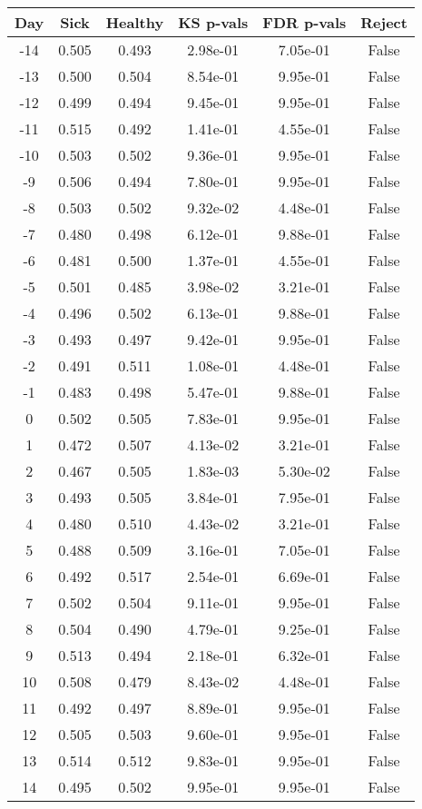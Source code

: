 \begin{tabular}{c|c|c|c|c|c}
Day &  Sick & Healthy &  KS p-vals & FDR p-vals & Reject\\
\hline
-14 & 0.505 &   0.493 &   2.98e-01 &   7.05e-01 &  False\\
-13 & 0.500 &   0.504 &   8.54e-01 &   9.95e-01 &  False\\
-12 & 0.499 &   0.494 &   9.45e-01 &   9.95e-01 &  False\\
-11 & 0.515 &   0.492 &   1.41e-01 &   4.55e-01 &  False\\
-10 & 0.503 &   0.502 &   9.36e-01 &   9.95e-01 &  False\\
 -9 & 0.506 &   0.494 &   7.80e-01 &   9.95e-01 &  False\\
 -8 & 0.503 &   0.502 &   9.32e-02 &   4.48e-01 &  False\\
 -7 & 0.480 &   0.498 &   6.12e-01 &   9.88e-01 &  False\\
 -6 & 0.481 &   0.500 &   1.37e-01 &   4.55e-01 &  False\\
 -5 & 0.501 &   0.485 &   3.98e-02 &   3.21e-01 &  False\\
 -4 & 0.496 &   0.502 &   6.13e-01 &   9.88e-01 &  False\\
 -3 & 0.493 &   0.497 &   9.42e-01 &   9.95e-01 &  False\\
 -2 & 0.491 &   0.511 &   1.08e-01 &   4.48e-01 &  False\\
 -1 & 0.483 &   0.498 &   5.47e-01 &   9.88e-01 &  False\\
  0 & 0.502 &   0.505 &   7.83e-01 &   9.95e-01 &  False\\
  1 & 0.472 &   0.507 &   4.13e-02 &   3.21e-01 &  False\\
  2 & 0.467 &   0.505 &   1.83e-03 &   5.30e-02 &  False\\
  3 & 0.493 &   0.505 &   3.84e-01 &   7.95e-01 &  False\\
  4 & 0.480 &   0.510 &   4.43e-02 &   3.21e-01 &  False\\
  5 & 0.488 &   0.509 &   3.16e-01 &   7.05e-01 &  False\\
  6 & 0.492 &   0.517 &   2.54e-01 &   6.69e-01 &  False\\
  7 & 0.502 &   0.504 &   9.11e-01 &   9.95e-01 &  False\\
  8 & 0.504 &   0.490 &   4.79e-01 &   9.25e-01 &  False\\
  9 & 0.513 &   0.494 &   2.18e-01 &   6.32e-01 &  False\\
 10 & 0.508 &   0.479 &   8.43e-02 &   4.48e-01 &  False\\
 11 & 0.492 &   0.497 &   8.89e-01 &   9.95e-01 &  False\\
 12 & 0.505 &   0.503 &   9.60e-01 &   9.95e-01 &  False\\
 13 & 0.514 &   0.512 &   9.83e-01 &   9.95e-01 &  False\\
 14 & 0.495 &   0.502 &   9.95e-01 &   9.95e-01 &  False\\
\end{tabular}